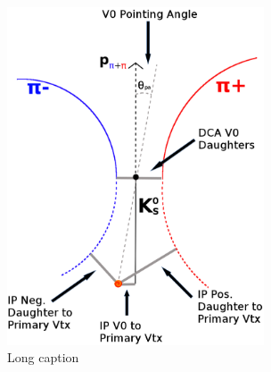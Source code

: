 \documentclass[../AnalysisNoteJBuxton.tex]{subfiles}
\begin{document}
\begin{figure}[h]
\begin{minipage}{18pc}
\includegraphics[width=18pc]{3_DataSelection/Figures/K0Cuts.pdf}
\end{minipage} 
\caption[Short Caption]{\label{fig:MomResLL} Long caption}
\end{figure}



\end{document}
